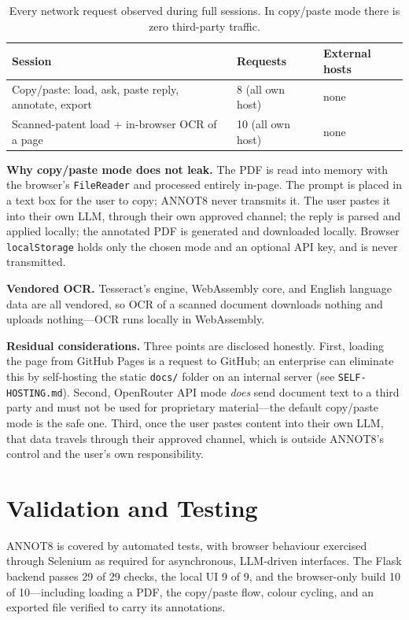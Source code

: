 \documentclass[11pt]{article}
\begin{document}
\begin{table}[ht]
\centering
\small
\begin{tabular}{lll}
\toprule
\textbf{Session} & \textbf{Requests} & \textbf{External hosts} \\
\midrule
Copy/paste: load, ask, paste reply, annotate, export & 8 (all own host) & none \\
Scanned-patent load + in-browser OCR of a page & 10 (all own host) & none \\
\bottomrule
\end{tabular}
\caption{Every network request observed during full sessions. In copy/paste
mode there is zero third-party traffic.}
\label{tab:net}
\end{table}

\textbf{Why copy/paste mode does not leak.} The PDF is read into memory with
the browser's \texttt{FileReader} and processed entirely in-page. The prompt is
placed in a text box for the user to copy; ANNOT8 never transmits it. The user
pastes it into their own LLM, through their own approved channel; the reply is
parsed and applied locally; the annotated PDF is generated and downloaded
locally. Browser \texttt{localStorage} holds only the chosen mode and an
optional API key, and is never transmitted.

\textbf{Vendored OCR.} Tesseract's engine, WebAssembly core, and English
language data are all vendored, so OCR of a scanned document downloads nothing
and uploads nothing---OCR runs locally in WebAssembly.

\textbf{Residual considerations.} Three points are disclosed honestly. First,
loading the page from GitHub Pages is a request to GitHub; an enterprise can
eliminate this by self-hosting the static \texttt{docs/} folder on an internal
server (see \texttt{SELF-HOSTING.md}). Second, OpenRouter API mode \emph{does}
send document text to a third party and must not be used for proprietary
material---the default copy/paste mode is the safe one. Third, once the user
pastes content into their own LLM, that data travels through their approved
channel, which is outside ANNOT8's control and the user's own responsibility.

\section{Validation and Testing}

ANNOT8 is covered by automated tests, with browser behaviour exercised through
Selenium as required for asynchronous, LLM-driven interfaces. The Flask backend
passes 29 of 29 checks, the local UI 9 of 9, and the browser-only build 10 of
10---including loading a PDF, the copy/paste flow, colour cycling, and an
exported file verified to carry its annotations.
\end{document}
